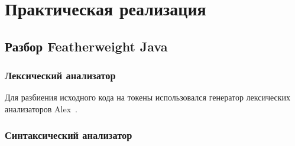\chapter{Практическая реализация}
\section{Разбор Featherweight Java}
\subsection{Лексический анализатор}
Для разбиения исходного кода на токены использовался генератор лексических анализаторов Alex~\cite{alex}.
\subsection{Синтаксический анализатор}
